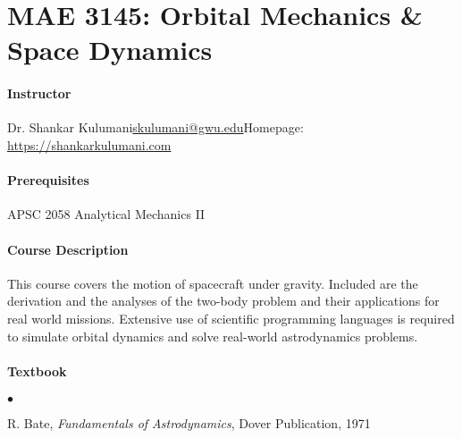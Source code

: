 \documentclass[10pt]{article}
\date{}
\begin{document}
\pagestyle{empty}
\section*{MAE 3145: Orbital Mechanics \& Space Dynamics}
\vspace*{-0.4cm}


\paragraph*{Instructor}
Dr. Shankar Kulumani\quad \href{mailto:skulumani@gwu.edu}{skulumani@gwu.edu}\quad Homepage: \url{https://shankarkulumani.com}

\paragraph*{Prerequisites} APSC 2058 Analytical Mechanics II

\paragraph*{Course Description} This course covers the motion of spacecraft under gravity. Included are the derivation and the analyses of the two-body problem and their applications for real world missions.
Extensive use of scientific programming languages is required to simulate orbital dynamics and solve real-world astrodynamics problems.

\paragraph*{Textbook}
\begin{list}{$\bullet$}{\setlength{\itemsep}{-3pt}}
\item R. Bate, \textit{Fundamentals of Astrodynamics}, Dover Publication, 1971
\end{list}
\end{document}
